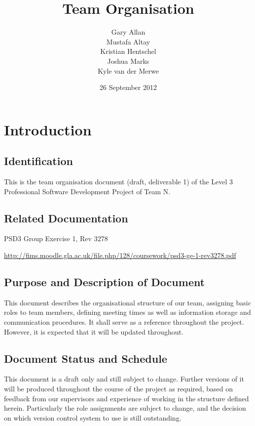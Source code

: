 \documentclass{l3deliverable}
\title{Team Organisation}
\author{
  Gary Allan\\
  Mustafa Altay\\
  Kristian Hentschel\\
  Joshua Marks\\
  Kyle van der Merwe\\
}
\date{26 September 2012}
\begin{document}

\maketitle


\section{Introduction}

\subsection{Identification}

This is the team organisation document (draft, deliverable 1) of the Level 3 Professional Software Development Project of Team N.

\subsection{Related Documentation}

\begin{list}{}{}
\item PSD3 Group Exercise 1, Rev 3278  \
  
  \url{http://fims.moodle.gla.ac.uk/file.php/128/coursework/psd3-ge-1-rev3278.pdf}
\end{list}
 

\subsection{Purpose and Description of Document}

This document describes the organisational structure of our team, assigning basic roles to team members, defining meeting times as well as information storage and communication procedures. It shall serve as a reference throughout the project. However, it is expected that it will be updated throughout.

\subsection{Document Status and Schedule}

This document is a draft only and still subject to change. Further versions of it will be produced throughout the course of the project as required, based on feedback from our supervisors and experience of working in the structure defined herein.
Particularly the role assignments are subject to change, and the decision on which version control system to use is still outstanding.
\end{document}
